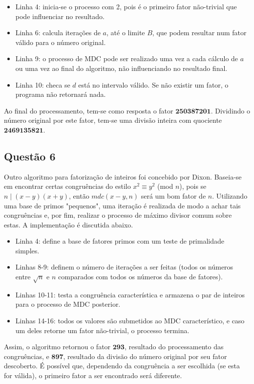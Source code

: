 \documentclass{article}
\begin{document}
\begin{itemize}

\item Linha 4: inicia-se o processo com 2, pois é o primeiro fator não-trivial que pode influenciar no resultado.
\item Linha 6: calcula iterações de $a$, até o limite $B$, que podem resultar num fator válido para o número original.
\item Linha 9: o processo de MDC pode ser realizado uma vez a cada cálculo de $a$ ou uma vez ao final do algoritmo, não influenciando no resultado final.
\item Linha 10: checa se $d$ está no intervalo válido. Se não existir um fator, o programa não retornará nada.
\end{itemize}
Ao final do processamento, tem-se como resposta o fator $\textbf{250387201}$. Dividindo o número original por este fator, tem-se uma divisão inteira com quociente $\textbf{2469135821}$.

\subsection*{Questão 6}
Outro algoritmo para fatorização de inteiros foi concebido por Dixon. Baseia-se em encontrar certas congruências do estilo $x^2 \equiv y^2$ (mod $n$), pois se $n \mid (x-y)(x+y)$, então $mdc(x-y, n)$ será um bom fator de $n$. Utilizando uma base de primos "pequenos", uma iteração é realizada de modo a achar tais congruências e, por fim, realizar o processo de máximo divisor comum sobre estas. A implementação é discutida abaixo.

\begin{itemize}

\item Linha 4: define a base de fatores primos com um teste de primalidade simples.
\item Linhas 8-9: definem o número de iterações a ser feitas (todos os números entre $\sqrt{n}$ e $n$ comparados com todos os números da base de fatores).
\item Linhas 10-11: testa a congruência característica e armazena o par de inteiros para o processo de MDC posterior.
\item Linhas 14-16: todos os valores são submetidos ao MDC característico, e caso um deles retorne um fator não-trivial, o processo termina.
\end{itemize}
Assim, o algoritmo retornou o fator $\textbf{293}$, resultado do processamento das congruências, e $\textbf{897}$, resultado da divisão do número original por seu fator descoberto. É possível que, dependendo da congruência a ser escolhida (se esta for válida), o primeiro fator a ser encontrado será diferente.
\end{document}
